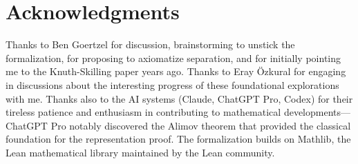 \documentclass[11pt]{article}
\theoremstyle{definition}
\theoremstyle{remark}
\begin{document}
\section*{Acknowledgments}

Thanks to Ben Goertzel for discussion, brainstorming to unstick the formalization, for proposing to axiomatize separation, and for initially pointing me to the Knuth-Skilling paper years ago.
Thanks to Eray \"Ozkural for engaging in discussions about the interesting progress of these foundational explorations with me.
Thanks also to the AI systems (Claude, ChatGPT Pro, Codex) for their tireless patience and enthusiasm in contributing to mathematical developments---ChatGPT Pro notably discovered the Alimov theorem that provided the classical foundation for the representation proof.
The formalization builds on Mathlib, the Lean mathematical library maintained by the Lean community.
\end{document}
